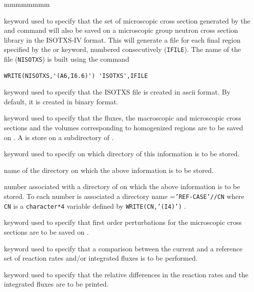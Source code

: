 \begin{ListeDeDescription}{mmmmmmmm}
\item[\moc{ISOTXS}] keyword used to specify that the set of microscopic cross
section generated by the  and  command will also
be saved on a microscopic group neutron cross section library in the ISOTXS-IV
format. This will generate a file for each final region specified by the
 or  keyword, numbered consecutively ({\tt IFILE}). The name
of the file ({\tt NISOTXS}) is built using the command 

\begin{verbatim}
WRITE(NISOTXS,'(A6,I6.6)') 'ISOTXS',IFILE
\end{verbatim}

\item[\moc{ASCII}] keyword used to specify that the ISOTXS file is created in ascii format.
By  default, it is created in binary format.

\item[\moc{SAVE}] keyword used to specify that the fluxes, the macroscopic and
microscopic cross sections and the volumes corresponding to homogenized regions
are to be saved on . A  is store on a subdirectory
of .

\item[\moc{ON}] keyword used to specify on which directory of  this
information is to be stored.

\item[\dusa{DIRN}] name of the directory on which the above information is to
be stored.

\item[\dusa{idirn}] number associated with a directory of  on
which the above information is to be stored. To each number  is
associated a directory name ={\tt 'REF-CASE'//CN} where {\tt CN} is a
{\tt character*4} variable defined by {\tt WRITE(CN,'(I4)')} .

\item[\moc{PERT}] keyword used to specify that first order perturbations for 
the microscopic cross sections are to be saved on . 

\item[\moc{STAT}] keyword used to specify that a comparison between the current and
a reference set of reaction rates and/or integrated fluxes is to be performed. 

\item[\moc{ALL}] keyword used to specify that the relative differences in the
reaction rates and the integrated fluxes are to be printed.


\end{ListeDeDescription}

